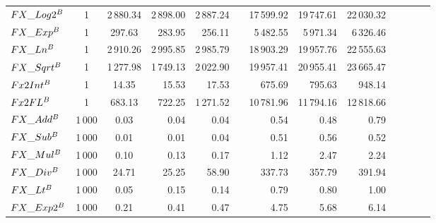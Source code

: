 \begin{table}
{\begin{tabular}{ l c c r r r r r r r r r r}
            $FX\_Log2^{B}$                         & 1       & 2\,880.34               & 2\,898.00  & 2\,887.24               &  & 17\,599.92  & 19\,747.61  & 22\,030.32  \\
            $FX\_Exp^{B}$                          & 1       & 297.63                  & 283.95     & 256.11                  &  & 5\,482.55   & 5\,971.34   & 6\,326.46   \\
            $FX\_Ln^{B}$                           & 1       & 2\,910.26               & 2\,995.85  & 2\,985.79               &  & 18\,903.29  & 19\,957.76  & 22\,555.63  \\
            $FX\_Sqrt^{B}$                         & 1       & 1\,277.98               & 1\,749.13  & 2\,022.90               &  & 19\,957.41  & 20\,955.41  & 23\,665.47  \\
            $Fx2Int^{B}$                           & 1       & 14.35                   & 15.53      & 17.53                   &  & 675.69      & 795.63      & 948.14      \\
            $Fx2FL^{B}$                            & 1       & 683.13                  & 722.25     & 1\,271.52               &  & 10\,781.96  & 11\,794.16  & 12\,818.66  \\
            \midrule
            $FX\_Add^{B}$                          & 1\,000  & 0.03                    & 0.04       & 0.04                    &  & 0.54        & 0.48        & 0.79        \\
            $FX\_Sub^{B}$                          & 1\,000  & 0.01                    & 0.01       & 0.04                    &  & 0.51        & 0.56        & 0.52        \\
            $FX\_Mul^{B}$                          & 1\,000  & 0.10                    & 0.13       & 0.17                    &  & 1.12        & 2.47        & 2.24        \\
            $FX\_Div^{B}$                          & 1\,000  & 24.71                   & 25.25      & 58.90                   &  & 337.73      & 357.79      & 391.94      \\
            $FX\_Lt^{B}$                           & 1\,000  & 0.05                    & 0.15       & 0.14                    &  & 0.79        & 0.80        & 1.00        \\
            $FX\_Exp2^{B}$                         & 1\,000  & 0.21                    & 0.41       & 0.47                    &  & 4.75        & 5.68        & 6.14        \\

\end{tabular}}
\end{table}
